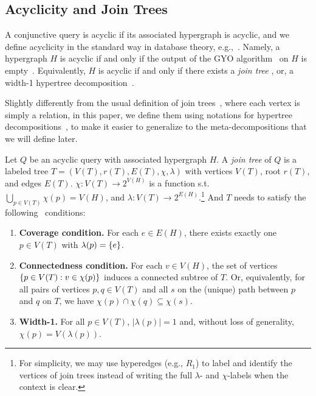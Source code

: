 



\subsection{Acyclicity and Join Trees}

A conjunctive query is acyclic if its associated hypergraph is acyclic, and we define acyclicity in the standard way in database theory, e.g.,~\cite[Section 6.4]{abiteboul_foundations_1996}. Namely, a hypergraph $H$ is acyclic if and only if the output of the GYO algorithm~\cite{grahamGYO, DBLP:conf/compsac/YuO79} on $H$ is empty~\cite[Theorem 6.4.5]{abiteboul_foundations_1996}. Equivalently, $H$ is acyclic if and only if there exists a \emph{join tree} \cite[Theorem 6.4.5]{abiteboul_foundations_1996}, or, a width-1 hypertree decomposition~\cite{DBLP:journals/jcss/GottlobLS02}.

Slightly differently from the usual definition of join trees~\cite{abiteboul_foundations_1996}, where each vertex is simply a relation, in this paper, we define them using notations for hypertree decompositions~\cite{DBLP:journals/jcss/GottlobLS02}, to make it easier to generalize to the meta-decompositions that we will define later.

Let $Q$ be an acyclic query with associated hypergraph $H$. A \emph{join tree} of $Q$ is a labeled tree $T = (V(T), r(T), E(T), \chi, \lambda)$
 with vertices $V(T)$, root $r(T)$, and edges $E(T)$.
$\chi : V(T) \to 2^{V(H)}$ is a function s.t.\ 
$\bigcup_{ p \in V(T) } \chi(p) = V(H)$,
and $\lambda : V(T) \to 2^{E(H)}$.\footnote{For simplicity, we may use hyperedges (e.g., $R_1$) to label and identify the vertices of join trees instead of writing the full $\lambda$- and $\chi$-labels when the context is clear.} And $T$ needs to satisfy the following~ conditions:
\begin{enumerate}[label=(C\textsubscript{\arabic*}),ref=(C\textsubscript{\arabic*}),leftmargin=*]
	\item\label{H1}\gdef\Giref{\ref{H1}} \textbf{Coverage condition.}  For each $e \in E(H)$, there exists exactly one $p \in V(T)$ with $\lambda(p) = \lbrace e\rbrace$.
	\item\label{H2}\gdef\Giiref{\ref{H2}} \textbf{Connectedness condition.} For each $v \in V(H)$, the set of vertices $\lbrace p \in V(T) : v \in \chi(p) \rbrace$ induces a connected subtree of $T$.
    Or, equivalently, for all pairs of vertices $p, q \in V(T)$ and all $s$ on the (unique) path between $p$ and $q$ on $T$, we have $\chi(p) \cap \chi(q) \subseteq \chi(s)$.
	\item\label{H3}\gdef\Giiiref{\ref{H3}} \textbf{Width-1.} For all $p \in V(T)$, $|\lambda(p)| = 1$ and, without loss of generality, $\chi(p) = V(\lambda(p)) $.
\end{enumerate}

